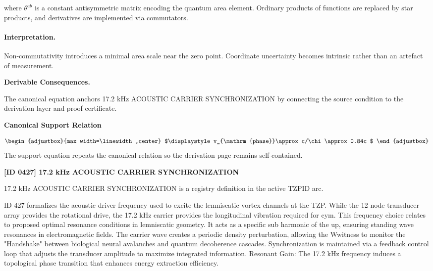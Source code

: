 where $\theta^{ab}$ is a constant antisymmetric matrix encoding the quantum area element.  Ordinary products of functions are replaced by star products, and derivatives are implemented via commutators.

\paragraph{Interpretation.}

Non‑commutativity introduces a minimal area scale near the zero point.  Coordinate uncertainty becomes intrinsic rather than an artefact of measurement.

\par\vspace{0.35em}
\noindent\textbf{Derivable Consequences.}\quad
\begingroup
\footnotesize
\raggedright
The canonical equation anchors 17.2 kHz ACOUSTIC CARRIER SYNCHRONIZATION by connecting the source condition to the derivation layer and proof certificate.
\par\endgroup

\noindent\textbf{Canonical Support Relation}\par
\[
\begin{adjustbox}{max width=\linewidth,center}
$\displaystyle
v_{\mathrm{phase}}\approx c/\chi\approx0.84c
$
\end{adjustbox}
\]
\noindent The support equation repeats the canonical relation so the derivation page remains self-contained.\par

\clearpage
\noindent\textbf{[ID 0427] 17.2 kHz ACOUSTIC CARRIER SYNCHRONIZATION}\par
\vspace{0.35em}
\begingroup\small
{}
17.2 kHz ACOUSTIC CARRIER SYNCHRONIZATION is a registry definition in the active TZPID arc.

ID 427 formalizes the acoustic driver frequency used to excite the lemniscatic vortex channels at the TZP. While the 12 node transducer array provides the rotational drive, the 17.2 kHz carrier provides the longitudinal vibration required for cym. This frequency choice relates to proposed optimal resonance conditions in lemniscatic geometry. It acts as a specific sub harmonic of the up, ensuring standing wave resonances in electromagnetic fields. The carrier wave creates a periodic density perturbation, allowing the Wwitness to monitor the "Handshake" between biological neural avalanches and quantum decoherence cascades. Synchronization is maintained via a feedback control loop that adjusts the transducer amplitude to maximize integrated information. Resonant Gain: The 17.2 kHz frequency induces a topological phase transition that enhances energy extraction efficiency.

